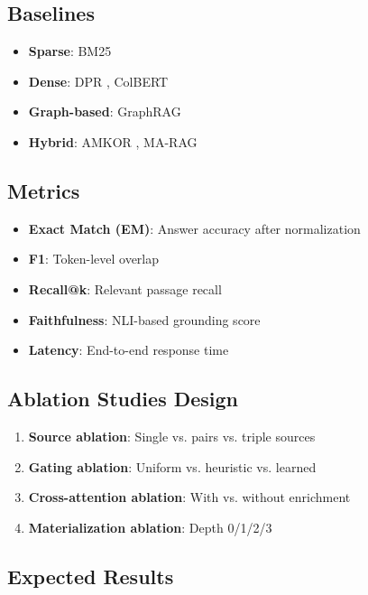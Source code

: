 \documentclass[10pt,twocolumn]{article}
\begin{document}
\subsection{Baselines}

\begin{itemize}
    \item \textbf{Sparse}: BM25
    \item \textbf{Dense}: DPR \cite{karpukhin2020dpr}, ColBERT \cite{khattab2020colbert}
    \item \textbf{Graph-based}: GraphRAG \cite{edge2024graphrag}
    \item \textbf{Hybrid}: AMKOR \cite{fang2024amkor}, MA-RAG \cite{li2024marag}
\end{itemize}

\subsection{Metrics}

\begin{itemize}
    \item \textbf{Exact Match (EM)}: Answer accuracy after normalization
    \item \textbf{F1}: Token-level overlap
    \item \textbf{Recall@k}: Relevant passage recall
    \item \textbf{Faithfulness}: NLI-based grounding score
    \item \textbf{Latency}: End-to-end response time
\end{itemize}

\subsection{Ablation Studies Design}

\begin{enumerate}
    \item \textbf{Source ablation}: Single vs. pairs vs. triple sources
    \item \textbf{Gating ablation}: Uniform vs. heuristic vs. learned
    \item \textbf{Cross-attention ablation}: With vs. without enrichment
    \item \textbf{Materialization ablation}: Depth 0/1/2/3
\end{enumerate}

\subsection{Expected Results}
\end{document}
